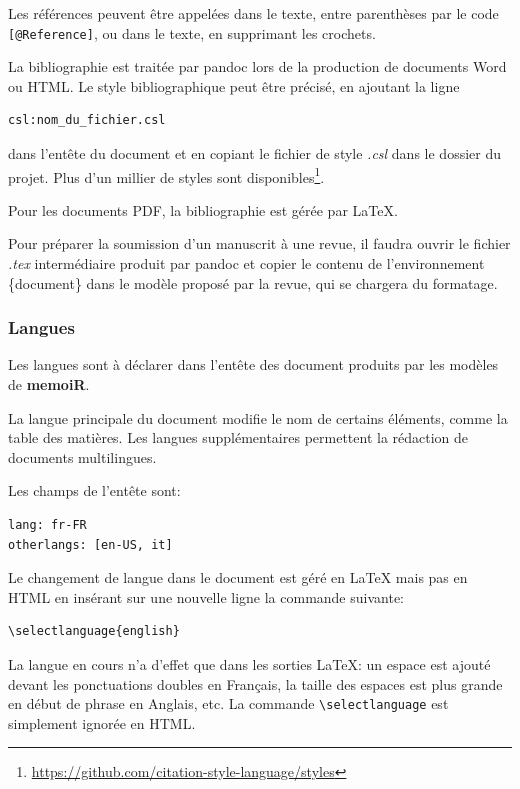 \documentclass[
  12pt,
  french,
  a4paper,
  extrafontsizes,onecolumn,openright
  ]{memoir}
\begin{document}
Les références peuvent être appelées dans le texte, entre parenthèses par le code \texttt{{[}@Reference{]}}, ou dans le texte, en supprimant les crochets.

La bibliographie est traitée par pandoc lors de la production de documents Word ou HTML.
Le style bibliographique peut être précisé, en ajoutant la ligne

\begin{verbatim}
csl:nom_du_fichier.csl
\end{verbatim}

dans l'entête du document et en copiant le fichier de style \emph{.csl} dans le dossier du projet.
Plus d'un millier de styles sont disponibles\footnote{\url{https://github.com/citation-style-language/styles}}.

Pour les documents PDF, la bibliographie est gérée par LaTeX.

Pour préparer la soumission d'un manuscrit à une revue, il faudra ouvrir le fichier \emph{.tex} intermédiaire produit par pandoc et copier le contenu de l'environnement \{document\} dans le modèle proposé par la revue, qui se chargera du formatage.

\subsubsection{Langues}\label{langues}

Les langues sont à déclarer dans l'entête des document produits par les modèles de \textbf{memoiR}.

La langue principale du document modifie le nom de certains éléments, comme la table des matières.
Les langues supplémentaires permettent la rédaction de documents multilingues.

Les champs de l'entête sont:

\begin{verbatim}
lang: fr-FR
otherlangs: [en-US, it]
\end{verbatim}

Le changement de langue dans le document est géré en LaTeX mais pas en HTML en insérant sur une nouvelle ligne la commande suivante:

\begin{verbatim}
\selectlanguage{english}
\end{verbatim}

La langue en cours n'a d'effet que dans les sorties LaTeX: un espace est ajouté devant les ponctuations doubles en Français, la taille des espaces est plus grande en début de phrase en Anglais, etc.
La commande \texttt{\textbackslash{}selectlanguage} est simplement ignorée en HTML.
\end{document}
